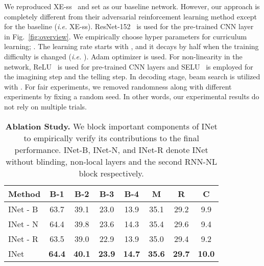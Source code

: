 \documentclass[letterpaper]{article} \usepackage{aaai20}  \usepackage{times}  \usepackage{helvet} \usepackage{courier}  \usepackage[hyphens]{url}  \usepackage{graphicx} \urlstyle{rm} \def\UrlFont{\rm}  \usepackage{graphicx}  \frenchspacing  \setlength{\pdfpagewidth}{8.5in}  \setlength{\pdfpageheight}{11in}
\newcommand{\figref}[1]{Fig.~\ref{#1}}
\newcommand{\ie}{{\it i.e. }}
\begin{document}
\noindent
We reproduced XE-ss~\cite{wang2018no} and set as our baseline network. However, our approach is completely different from their adversarial reinforcement learning method except for the baseline (\ie XE-ss). ResNet-152~\cite{he2016deep} is used for the pre-trained CNN layer in \figref{fig:overview}. We empirically choose hyper parameters for curriculum learning; . The learning rate starts with , and it decays by half when the training difficulty is changed (\ie ). Adam optimizer is used. For non-linearity in the network, ReLU~\cite{nair2010rectified} is used for pre-trained CNN layers and SELU~\cite{klambauer2017self} is employed for the imagining step and the telling step. In decoding stage, beam search is utilized with . For fair experiments, we removed randomness along with different experiments by fixing a random seed. In other words, our experimental results do not rely on multiple trials. 

\begin{table}
\centering
\resizebox{1.0\linewidth}{!}
{\begin{tabular}{ l | c  c  c  c  c  c  c}
\hline
Method & B-1 & B-2 & B-3 & B-4 & M & R & C    \\
\hline
\hline
INet - B        & 63.7 & 39.1 & 23.0 & 13.9 & 35.1 & 29.2 & 9.9  \\
INet - N        & 64.4 & 39.8 & 23.6 & 14.3 & 35.4 & 29.6 & 9.4  \\
INet - R        & 63.5 & 39.0 & 22.9 & 13.9 & 35.0 & 29.4 & 9.2  \\
\hline
INet         & \textbf{64.4} & \textbf{40.1} & \textbf{23.9} & \textbf{14.7} & \textbf{35.6} & \textbf{29.7} & \textbf{10.0}  \\
\hline
\end{tabular}
}
\caption{\textbf{Ablation Study.} We block important components of INet to empirically verify its contributions to the final performance. INet-B, INet-N, and INet-R denote INet without blinding, non-local layers and the second RNN-NL block respectively.}
\label{tab:ablation}
\end{table}
\end{document}
